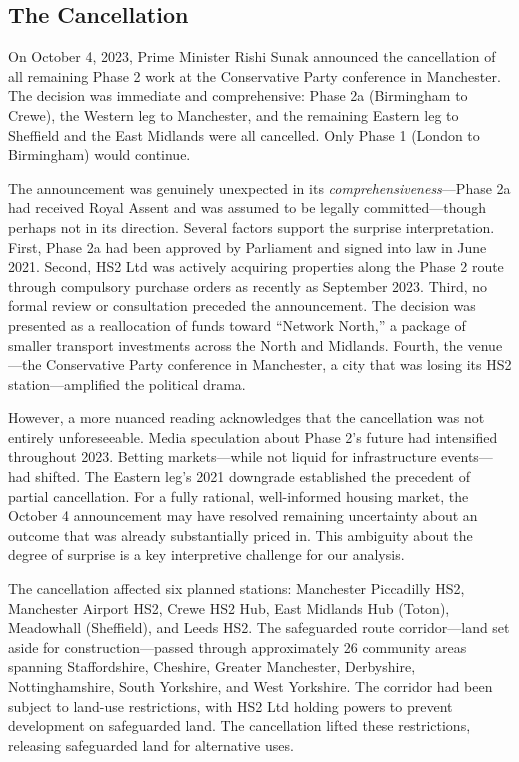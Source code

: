 \documentclass[12pt]{article}
\begin{document}
\subsection{The Cancellation}

On October 4, 2023, Prime Minister Rishi Sunak announced the cancellation of all remaining Phase 2 work at the Conservative Party conference in Manchester. The decision was immediate and comprehensive: Phase 2a (Birmingham to Crewe), the Western leg to Manchester, and the remaining Eastern leg to Sheffield and the East Midlands were all cancelled. Only Phase 1 (London to Birmingham) would continue.

The announcement was genuinely unexpected in its \textit{comprehensiveness}---Phase 2a had received Royal Assent and was assumed to be legally committed---though perhaps not in its direction. Several factors support the surprise interpretation. First, Phase 2a had been approved by Parliament and signed into law in June 2021. Second, HS2 Ltd was actively acquiring properties along the Phase 2 route through compulsory purchase orders as recently as September 2023. Third, no formal review or consultation preceded the announcement. The decision was presented as a reallocation of funds toward ``Network North,'' a package of smaller transport investments across the North and Midlands. Fourth, the venue---the Conservative Party conference in Manchester, a city that was losing its HS2 station---amplified the political drama.

However, a more nuanced reading acknowledges that the cancellation was not entirely unforeseeable. Media speculation about Phase 2's future had intensified throughout 2023. Betting markets---while not liquid for infrastructure events---had shifted. The Eastern leg's 2021 downgrade established the precedent of partial cancellation. For a fully rational, well-informed housing market, the October 4 announcement may have resolved remaining uncertainty about an outcome that was already substantially priced in. This ambiguity about the degree of surprise is a key interpretive challenge for our analysis.

The cancellation affected six planned stations: Manchester Piccadilly HS2, Manchester Airport HS2, Crewe HS2 Hub, East Midlands Hub (Toton), Meadowhall (Sheffield), and Leeds HS2. The safeguarded route corridor---land set aside for construction---passed through approximately 26 community areas spanning Staffordshire, Cheshire, Greater Manchester, Derbyshire, Nottinghamshire, South Yorkshire, and West Yorkshire. The corridor had been subject to land-use restrictions, with HS2 Ltd holding powers to prevent development on safeguarded land. The cancellation lifted these restrictions, releasing safeguarded land for alternative uses.
\end{document}
